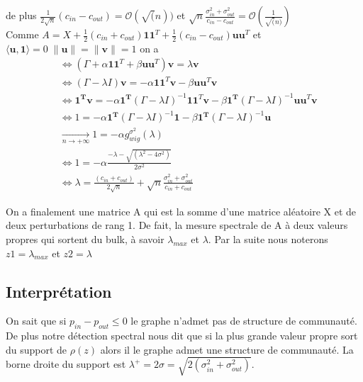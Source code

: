 de plus $\frac{1}{2\sqrt{n}}(c_{in} - c_{out}) = \mathcal{O}(\sqrt(n))$ et $\sqrt{n}\frac{\sigma_{in}^2 + \sigma_{out}^2}{c_{in} - c_{out}} =  \mathcal{O}(\frac{1}{\sqrt(n)})$\\
 
Comme $A = X + \frac{1}{2}(c_{in} + c_{out})\mathbf{11}^T + \frac{1}{2}(c_{in} - c_{out})\mathbf{uu}^T$ et $\langle\mathbf{u}, \mathbf{1}\rangle = 0 \; \|\mathbf{u}\|=\|\mathbf{v}\|=1$ on a
\begin{align}
	&\Leftrightarrow (\Gamma + \alpha\mathbf{11}^T + \beta \mathbf{uu}^T)\mathbf{v} = \lambda \mathbf{v}\nonumber\\
	&\Leftrightarrow (\Gamma - \lambda I)\mathbf{v} = -\alpha\mathbf{11}^T\mathbf{v} - \beta \mathbf{uu}^T\mathbf{v} \nonumber\\
	&\Leftrightarrow \mathbf{1^Tv} = -\alpha\mathbf{1^T} (\Gamma - \lambda I)^{-1}\mathbf{11}^T\mathbf{v} - \beta \mathbf{1^T} (\Gamma - \lambda I)^{-1}\mathbf{uu}^T\mathbf{v} \nonumber\\
	&\Leftrightarrow 1 = -\alpha\mathbf{1^T} (\Gamma - \lambda I)^{-1}\mathbf{1} - \beta \mathbf{1^T} (\Gamma - \lambda I)^{-1}\mathbf{u} \nonumber\\
	&\xrightarrow[n \to +\infty]{} 1 = -\alpha g_{wig}^{\sigma^2}(\lambda) \nonumber\\
	&\Leftrightarrow 1 = -\alpha  \frac{- \lambda - \sqrt{(\lambda^2 - 4\sigma^2)}}{2\sigma^2}\nonumber\\
	&\Leftrightarrow \lambda = \frac{(c_{in} + c_{out})}{2\sqrt{n}} + \sqrt{n}\frac{\sigma_{in}^2 + \sigma_{out}^2}{c_{in} + c_{out}} \label{z2}
\end{align} 

On a finalement une matrice A qui est la somme d'une matrice aléatoire X et de deux perturbations de rang 1.
De fait, la mesure spectrale de A à deux valeurs propres qui sortent du bulk, à savoir $\lambda_{max}$ et $\lambda$.
Par la suite nous noterons $z1 = \lambda_{max}$ et $z2 = \lambda$

\subsection{Interprétation}
On sait que si $p_{in} - p_{out} \le 0$  le graphe n'admet pas de structure de communauté.
De plus notre détection spectral nous dit que si la plus grande valeur propre sort du support de $\rho(z)$ alors il le graphe admet une structure de communauté.
La borne droite du support est $\lambda^+ = 2\sigma = \sqrt{2(\sigma_{in}^2 + \sigma_{out}^2)}$.

